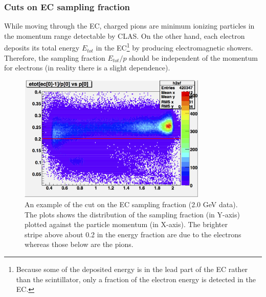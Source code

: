 \subsubsection{Cuts on EC sampling fraction}
While moving through the EC, charged pions are minimum ionizing particles in the momentum range detectable by CLAS. On the other hand, each electron deposits its total energy $E_{tot}$ in the EC\footnote{Because some of the deposited energy is in the lead part of the EC rather than the scintillator, only a fraction of the electron energy is detected in the EC.} %
by %
producing electromagnetic showers. %
Therefore, the sampling fraction $E_{tot}/p$ should be independent of the momentum for electrons (in reality there is a slight dependence). 

\begin{figure}[H] %
\centering
\leavevmode \includegraphics[width=0.8\textwidth]{figuresEG4/FigCuts/ecCuts_sfVp2D_Eb2allEv.png}  %
\caption[EC sampling fraction cut (2.0 GeV)]{An example of the cut on the EC sampling fraction (2.0 GeV data). The plots shows the distribution of the sampling fraction (in Y-axis) plotted against the particle momentum (in X-axis). The brighter stripe above about 0.2 in the energy fraction are due to the electrons whereas those below are the pions.
}
\label{ecSf}
\end{figure}


